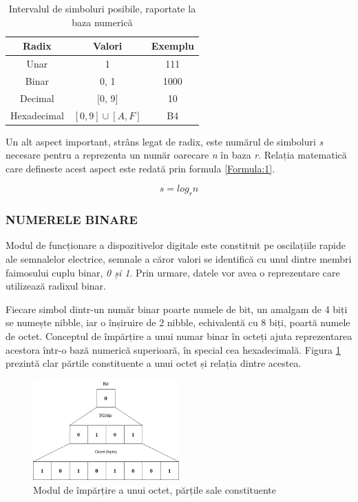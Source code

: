\documentclass[12pt]{article}
\begin{document}
\begin{table}[h]
\centering
\caption{Intervalul de simboluri posibile, raportate la baza numerică }
\label{Tabela:1}
\begin{tabular}{ ||c|c|c|| }
 \hline
 Radix & Valori & Exemplu \\ 
 \hline  \hline
 Unar & 1 & 111\\
 \hline
 Binar & 0, 1 & 1000\\ 
 \hline
 Decimal & [0, 9]  & 10\\ 
 \hline 
 Hexadecimal & $[0, 9] \cup [A, F]$ & B4\\ 
 \hline
\end{tabular}
\end{table}

Un alt aspect important, strâns legat de radix, este numărul de simboluri \textit{s} necesare pentru a reprezenta un număr oarecare \textit{n} în baza \textit{r}. Relația matematică care defineste acest aspect este redată prin formula \ref{Formula:1}.

\begin{equation}
\label{Formula:1}
s = log_r n
\end{equation}


\subsubsection{NUMERELE BINARE}
Modul de funcționare a dispozitivelor digitale  este constituit pe oscilațiile rapide ale semnalelor electrice, semnale a căror valori se identifică cu unul dintre membri faimosului cuplu binar, \textit{0 și 1}. Prin urmare, datele vor avea o reprezentare care utilizează radixul binar. 

Fiecare simbol dintr-un număr binar poarte numele de bit, un amalgam de 4 biți se numește nibble, iar o înșiruire de 2 nibble, echivalentă cu 8 biți, poartă numele de octet. Conceptul de împărțire a unui numar binar în octeți ajuta reprezentarea acestora într-o bază numerică superioară, în special cea hexadecimală. Figura \ref{Figura:1} prezintă clar părtile constituente a unui octet și relația dintre acestea.

 \begin{figure}[h!]
 \centering
 \caption{Modul de împărțire a unui octet, părțile sale constituente}
 \label{Figura:1}
 \includegraphics[width=0.5\textwidth]{byte.png}
 \end{figure}
\end{document}
